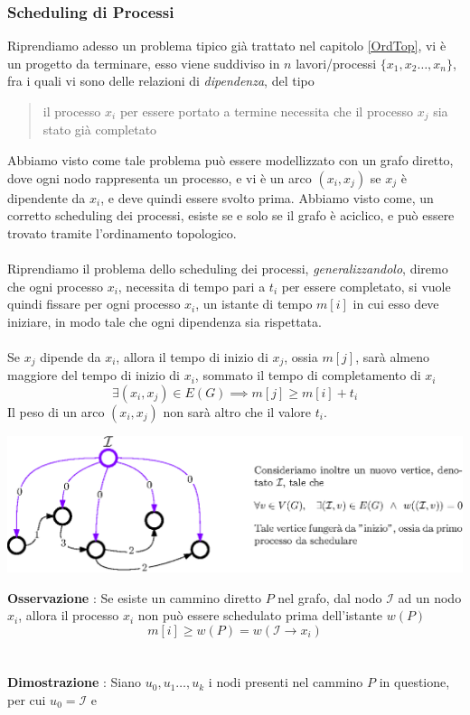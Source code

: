 \documentclass[12pt, letterpaper]{article}
\newcommand{\acc}{\\\hphantom{}\\}
\begin{document}
\subsubsection{Scheduling di Processi}
Riprendiamo adesso un problema tipico già trattato nel capitolo \ref{OrdTop}, vi è un progetto da terminare, esso viene 
suddiviso in $n$ lavori/processi $\{x_1,x_2\dots,x_n\}$,
 fra i quali vi sono delle relazioni di \textit{dipendenza}, del tipo\begin{quote}
    il processo $x_i$ per essere portato a termine necessita che il processo $x_j$ sia stato già completato
 \end{quote}
 Abbiamo visto come tale problema può essere modellizzato con un grafo diretto, dove ogni nodo rappresenta un processo, 
 e vi è un arco $(x_i,x_j)$ se $x_j$ è dipendente da $x_i$, e deve quindi essere svolto prima. Abbiamo visto come, un 
 corretto scheduling dei processi, esiste se e solo se il grafo è aciclico, e può essere trovato 
 tramite l'ordinamento topologico.\acc 
 Riprendiamo il problema dello scheduling dei processi, \textit{generalizzandolo}, diremo che ogni processo $x_i$, necessita 
 di tempo pari a $t_i$ per essere completato, si vuole quindi fissare per ogni processo $x_i$, un istante di tempo 
 $m[i]$ in cui esso deve iniziare, in modo tale che ogni dipendenza sia rispettata.\acc 
 Se $x_j$ dipende da $x_i$, allora il tempo di inizio di $x_j$, ossia $m[j]$, sarà almeno maggiore del tempo di inizio di $x_i$, 
 sommato il tempo di completamento di $x_i$ $$\exists(x_i,x_j)\in E(G)\implies m[j]\ge m[i]+t_i $$
Il peso di un arco $(x_i,x_j)$ non sarà altro che il valore $t_i$.\begin{center}
    \includegraphics[width=1\textwidth ]{images/initNode.eps}
\end{center}
\textbf{Osservazione} : Se esiste un cammino diretto $P$ nel grafo, dal nodo $\mathcal{I}$ ad un nodo $x_i$, allora il processo 
$x_i$ non può essere schedulato prima dell'istante $w(P)$ $$m[i]\ge w(P) = w(\mathcal{I}\rightarrow x_i)$$\acc 
\textbf{Dimostrazione} : Siano $u_0,u_1\dots,u_k$ i nodi presenti nel cammino $P$ in questione, per cui $u_0=\mathcal{I}$ e 
\end{document}
